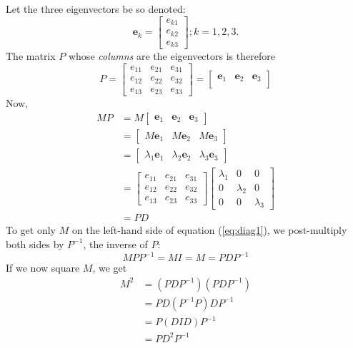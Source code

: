 \documentclass[
  12pt,
  a4paper,
]{article}
\begin{document}
Let the three eigenvectors be so denoted: \[
\symbf{e}_{k} = \begin{bmatrix}
e_{k1}\\
e_{k2}\\
e_{k3}
\end{bmatrix} ; k = 1, 2, 3.
\] The matrix \(P\) whose \emph{columns} are the eigenvectors is
therefore \[
P = \begin{bmatrix}
e_{11} & e_{21} & e_{31}\\
e_{12} & e_{22} & e_{32}\\
e_{13} & e_{23} & e_{33}
\end{bmatrix}
= \begin{bmatrix}
\symbf{e}_{1} & \symbf{e}_{2} & \symbf{e}_{3}\\
\end{bmatrix}
\] Now, \begin{equation}
\begin{aligned}
MP &= M\begin{bmatrix}
\symbf{e}_{1} & \symbf{e}_{2} & \symbf{e}_{3}
\end{bmatrix}\\
&= \begin{bmatrix}
M\symbf{e}_{1} & M\symbf{e}_{2} & M\symbf{e}_{3}
\end{bmatrix}\\
&= \begin{bmatrix}
\lambda_{1}\symbf{e}_{1} & \lambda_{2}\symbf{e}_{2} & \lambda_{3}\symbf{e}_{3}
\end{bmatrix}\\
&= \begin{bmatrix}
e_{11} & e_{21} & e_{31}\\
e_{12} & e_{22} & e_{32}\\
e_{13} & e_{23} & e_{33}
\end{bmatrix}
\begin{bmatrix}
\lambda_{1} & 0 & 0\\
0 & \lambda_{2} & 0\\
0 & 0 & \lambda_{3}
\end{bmatrix}\\
&= PD
\end{aligned}
\label{eq:diag1}\end{equation} To get only \(M\) on the left-hand side
of equation (\ref{eq:diag1}), we post-multiply both sides by \(P^{-1}\),
the inverse of \(P\): \begin{equation}
MPP^{-1} = MI = M = PDP^{-1}
\label{eq:eigendecomp}\end{equation} If we now square \(M\), we get
\begin{equation}
\begin{aligned}
M^{2} &= (PDP^{-1})(PDP^{-1})\\
&= PD(P^{-1}P)DP^{-1}\\
&= P(DID)P^{-1}\\
&= PD^{2}P^{-1}
\end{aligned}
\label{eq:D-squared}\end{equation}
\end{document}
